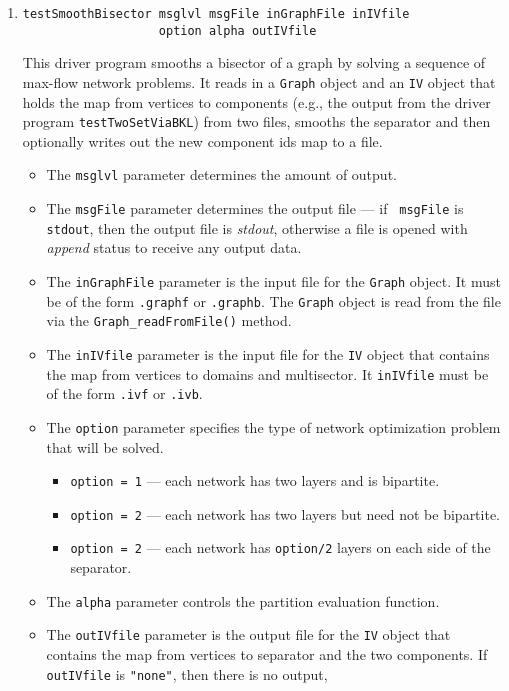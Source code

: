 \begin{enumerate}
\item
\begin{verbatim}
testSmoothBisector msglvl msgFile inGraphFile inIVfile 
                   option alpha outIVfile
\end{verbatim}
This driver program smooths a bisector of a graph by solving a
sequence of max-flow network problems.
It reads in a {\tt Graph} object and an {\tt IV} object that holds
the map from vertices to components (e.g., the output from the
driver program {\tt testTwoSetViaBKL}) from two files, 
smooths the separator and
then optionally writes out the new component ids map to a file.
\par
\begin{itemize}
\item
The {\tt msglvl} parameter determines the amount of output.
\item
The {\tt msgFile} parameter determines the output file --- if {\tt
msgFile} is {\tt stdout}, then the output file is {\it stdout},
otherwise a file is opened with {\it append} status to receive any
output data.
\item
The {\tt inGraphFile} parameter is the input file for the {\tt Graph}
object. It must be of the form {\tt *.graphf} or {\tt *.graphb}.
The {\tt Graph} object is read from the file via the
{\tt Graph\_readFromFile()} method.
\item
The {\tt inIVfile} parameter is the input file for the {\tt IV}
object that contains the map from vertices to domains and multisector. 
It {\tt inIVfile} must be of the form {\tt *.ivf} or {\tt *.ivb}.
\item
The {\tt option} parameter specifies the type of network
optimization problem that will be solved.
\begin{itemize}
\item
{\tt option = 1} --- each network has two layers and is bipartite.
\item
{\tt option = 2} 
--- each network has two layers but need not be bipartite.
\item
{\tt option = 2} --- each network has {\tt option/2} layers
on each side of the separator.
\end{itemize}
\item
The {\tt alpha} parameter controls the partition evaluation function.
\item
The {\tt outIVfile} parameter is the output file for the {\tt IV}
object that contains the map from vertices to separator and the 
two components. 
If {\tt outIVfile} is {\tt "none"}, then there is no output,

\end{itemize}
\end{enumerate}

